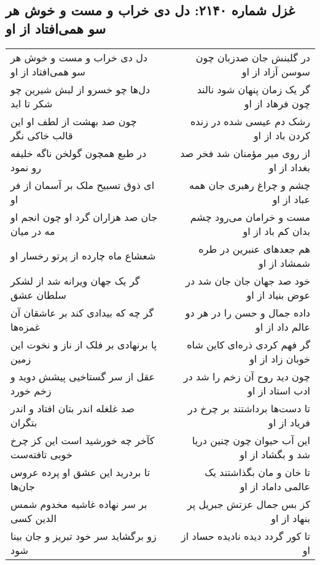 \begin{center}
\section*{غزل شماره ۲۱۴۰: دل دی خراب و مست و خوش هر سو همی‌افتاد از او}
\label{sec:2140}
\begin{longtable}{l p{0.5cm} r}
دل دی خراب و مست و خوش هر سو همی‌افتاد از او
&&
در گلبنش جان صدزبان چون سوسن آزاد از او
\\
دل‌ها چو خسرو از لبش شیرین چو شکر تا ابد
&&
گر یک زمان پنهان شود نالند چون فرهاد از او
\\
چون صد بهشت از لطف او این قالب خاکی نگر
&&
رشک دم عیسی شده در زنده کردن باد از او
\\
در طبع همچون گولخن ناگه خلیفه رو نمود
&&
از روی میر مؤمنان شد فخر صد بغداد از او
\\
ای ذوق تسبیح ملک بر آسمان از فر او
&&
چشم و چراغ رهبری جان همه عباد از او
\\
جان صد هزاران گرد او چون انجم او مه در میان
&&
مست و خرامان می‌رود چشم بدان کم باد از او
\\
شعشاع ماه چارده از پرتو رخسار او
&&
هم جعدهای عنبرین در طره شمشاد از او
\\
گر یک جهان ویرانه شد از لشکر سلطان عشق
&&
خود صد جهان جان جان شد در عوض بنیاد از او
\\
گر چه که بیدادی کند بر عاشقان آن غمزه‌ها
&&
داده جمال و حسن را در هر دو عالم داد از او
\\
پا برنهادی بر فلک از ناز و نخوت این زمین
&&
گر فهم کردی ذره‌ای کاین شاه خوبان زاد از او
\\
عقل از سر گستاخیی پیشش دوید و زخم خورد
&&
چون دید روح آن زخم را شد در ادب استاد از او
\\
صد غلغله اندر بتان افتاد و اندر بتگران
&&
تا دست‌ها برداشتند بر چرخ در فریاد از او
\\
کآخر چه خورشید است این کز چرخ خوبی تافته‌ست
&&
این آب حیوان چون چنین دریا شد و بگشاد از او
\\
تا بردرید این عشق او پرده عروس جان‌ها
&&
تا خان و مان بگذاشتند یک عالمی داماد از او
\\
بر سر نهاده غاشیه مخدوم شمس الدین کسی
&&
کز بس جمال عزتش جبریل پر بنهاد از او
\\
زو برگشاید سر خود تبریز و جان بینا شود
&&
تا کور گردد دیده نادیده حساد از او
\\
\end{longtable}
\end{center}
